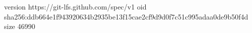 version https://git-lfs.github.com/spec/v1
oid sha256:ddb664e1f943920634b2935be13f15cae2cf9d9d0f7c51c995adaa0de9b50f4d
size 46990
